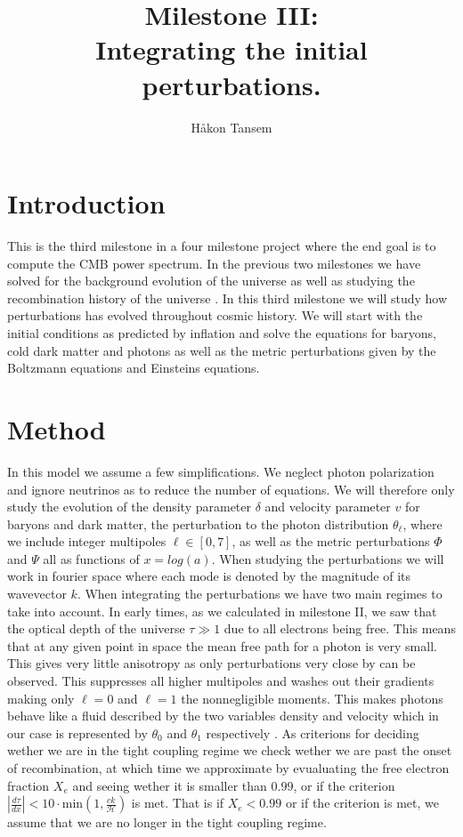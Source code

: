 \documentclass[onecolumn]{aastex62}
\begin{document}
\title{\Large Milestone III:\\Integrating the initial perturbations.}


\author{Håkon Tansem}

\section{Introduction} \label{sec:intro}
This is the third milestone in a four milestone project where the end goal is to compute the CMB power spectrum. In the previous two milestones we have solved for the background evolution of the universe \cite{TansemI:2020} as well as studying the recombination history of the universe \cite{TansemII:2020}. In this third milestone we will study how perturbations has evolved throughout cosmic history. We will start with the initial conditions as predicted by inflation and solve the equations for baryons, cold dark matter and photons as well as the metric perturbations given by the Boltzmann equations and Einsteins equations.
\section{Method} \label{sec:method}
In this model we assume a few simplifications. We neglect photon polarization and ignore neutrinos as to reduce the number of equations. We will therefore only study the evolution of the density parameter $\delta$ and velocity parameter $v$ for baryons and dark matter, the perturbation to the photon distribution $\theta_{\ell}$, where we include integer multipoles $\ell\in[0, 7]$, as well as the metric perturbations $\Phi$ and $\Psi$ all as functions of $x=log(a)$. When studying the perturbations we will work in fourier space where each mode is denoted by the magnitude of its wavevector $k$. When integrating the perturbations we have two main regimes to take into account. In early times, as we calculated in milestone II, we saw that the optical depth of the universe $\tau\gg1$ due to all electrons being free. This means that at any given point in space the mean free path for a photon is very small. This gives very little anisotropy as only perturbations very close by can be observed. This suppresses all higher multipoles and washes out their gradients making only $\ell=0$ and $\ell=1$ the nonnegligible moments. This makes photons behave like a fluid described by the two variables density and velocity which in our case is represented by $\theta_0$ and $\theta_1$ respectively \citep[p. 225]{Dodelson:1282338}. As criterions for deciding wether we are in the tight coupling regime we check wether we are past the onset of recombination, at which time we approximate by evualuating the free electron fraction $X_e$ and seeing wether it is smaller than $0.99$, or if the criterion $\left|\frac{d\tau}{dx}\right| < 10 \cdot \text{min}(1, \frac{ck}{\mathcal{H}})$ is met. That is if $X_e < 0.99$ or if the criterion is met, we assume that we are no longer in the tight coupling regime.\\\indent
\end{document}
